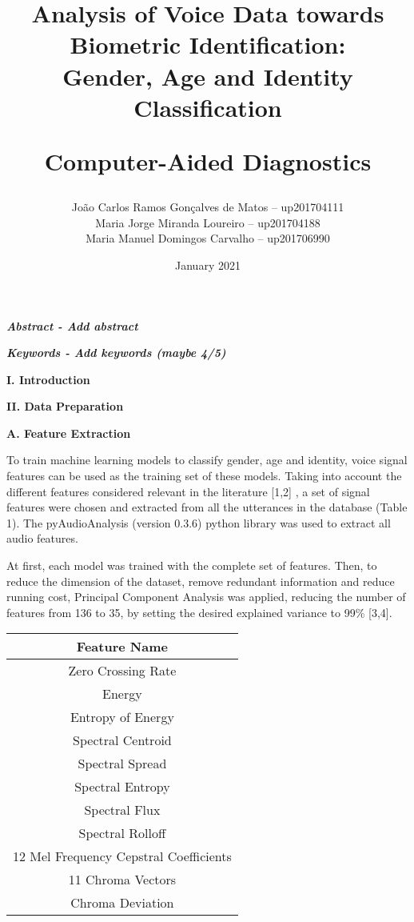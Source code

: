 \documentclass{article}
\title{\textbf{Analysis of Voice Data towards Biometric Identification:\\ Gender, Age and Identity Classification}\par Computer-Aided Diagnostics}
\author{
João Carlos Ramos Gonçalves de Matos – up201704111\\
Maria Jorge Miranda Loureiro – up201704188\\
Maria Manuel Domingos Carvalho – up201706990\\
}
\date{\nth{15} January 2021}
\begin{document}
\maketitle
\thispagestyle{empty} 

\justify
\normalsize
\setlength{\parindent}{0pt}

\textbf{\emph{Abstract - Add abstract} }
\vspace{2mm}

\textbf{\emph{Keywords - Add keywords (maybe 4/5) } }
\vspace{2mm}

\textbf{I. Introduction}\par

\vspace{2mm}
\textbf{II. Data Preparation }\par

\vspace{2mm}
\textbf{ A. Feature Extraction }\par
To train machine learning models to classify gender, age and identity, voice signal features can be used as the training set of these models. Taking into account the different features considered relevant in the literature [1,2] , a set of signal features were chosen and extracted from all the utterances in the database (Table 1). The pyAudioAnalysis (version 0.3.6) python library was used to extract all audio features.

At first, each model was trained with the complete set of features. Then, to reduce the dimension of the dataset, remove redundant information and reduce running cost, Principal Component Analysis was applied, reducing the number of features from 136 to 35, by setting the desired explained variance to 99\% [3,4].

\begin{center}
\label{table1} %
\begin{tabular}[c]{ |c| } 
 \hline
 \textbf{Feature Name}  \\ [1ex]
 \hline
 Zero Crossing Rate \\ [0.5ex]
 Energy \\ [0.5ex]
 Entropy of Energy \\ [0.5ex]
 Spectral Centroid  \\ [0.5ex]
 Spectral Spread \\ [0.5ex]
 Spectral Entropy \\ [0.5ex]
 Spectral Flux \\ [0.5ex]
 Spectral Rolloff \\ [0.5ex]
 12 Mel Frequency Cepstral Coefficients \\ [0.5ex]
 11 Chroma Vectors \\ [0.5ex]
 Chroma Deviation \\ [0.5ex]
 \hline
\end{tabular}
\end{center}
\end{document}
